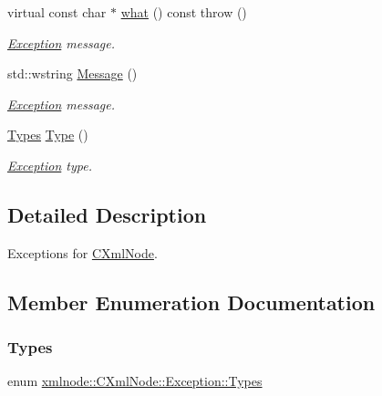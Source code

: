 \begin{DoxyCompactItemize}
virtual const char $\ast$ \mbox{\hyperlink{classxmlnode_1_1_c_xml_node_1_1_exception_a55ec16b50448dfa3be05f50051e5ea85}{what}} () const  throw ()
\begin{DoxyCompactList}\small\item\em \mbox{\hyperlink{classxmlnode_1_1_c_xml_node_1_1_exception}{Exception}} message. \end{DoxyCompactList}\item 
std\+::wstring \mbox{\hyperlink{classxmlnode_1_1_c_xml_node_1_1_exception_a29271ad0ec50958663200f60aaae97b2}{Message}} ()
\begin{DoxyCompactList}\small\item\em \mbox{\hyperlink{classxmlnode_1_1_c_xml_node_1_1_exception}{Exception}} message. \end{DoxyCompactList}\item 
\mbox{\hyperlink{classxmlnode_1_1_c_xml_node_1_1_exception_abdbe07531ef4b19192f1fa2f819ed75f}{Types}} \mbox{\hyperlink{classxmlnode_1_1_c_xml_node_1_1_exception_a872eb6da8739faf5424baf6515b43793}{Type}} ()
\begin{DoxyCompactList}\small\item\em \mbox{\hyperlink{classxmlnode_1_1_c_xml_node_1_1_exception}{Exception}} type. \end{DoxyCompactList}\end{DoxyCompactItemize}


\subsection{Detailed Description}
Exceptions for \mbox{\hyperlink{classxmlnode_1_1_c_xml_node}{C\+Xml\+Node}}. 

\subsection{Member Enumeration Documentation}
\mbox{\label{classxmlnode_1_1_c_xml_node_1_1_exception_abdbe07531ef4b19192f1fa2f819ed75f}} 
\subsubsection{\texorpdfstring{Types}{Types}}
{\footnotesize\ttfamily enum \mbox{\hyperlink{classxmlnode_1_1_c_xml_node_1_1_exception_abdbe07531ef4b19192f1fa2f819ed75f}{xmlnode\+::\+C\+Xml\+Node\+::\+Exception\+::\+Types}}}



